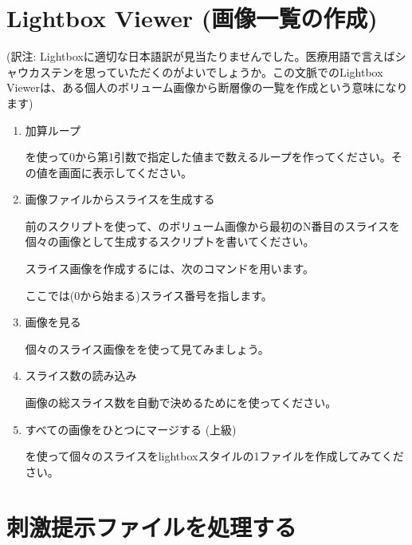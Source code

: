 \documentclass{jsarticle}
\begin{document}
\section{Lightbox Viewer (画像一覧の作成)}

\noindent (訳注: Lightboxに適切な日本語訳が見当たりませんでした。医療用語で言えばシャウカステンを思っていただくのがよいでしょうか。この文脈でのLightbox Viewerは、ある個人のボリューム画像から断層像の一覧を作成という意味になります)

\begin{enumerate}

\item 加算ループ

{\color{red}}を使って0から第1引数で指定した値まで数えるループを作ってください。その値を画面に表示してください。

\item 画像ファイルからスライスを生成する

前のスクリプトを使って、{\color{red}}のボリューム画像から最初のN番目のスライスを個々の画像として生成するスクリプトを書いてください。

スライス画像を作成するには、次のコマンドを用います。

{\color{red}}

ここで{\color{red}}は(0から始まる)スライス番号を指します。

\item 画像を見る

個々のスライス画像を{\color{red}}を使って見てみましょう。

\item スライス数の読み込み

画像の総スライス数を自動で決めるために{\color{red}}を使ってください。

\item すべての画像をひとつにマージする (上級)

{\color{red}}を使って個々のスライスをlightboxスタイルの1ファイルを作成してみてください。

\end{enumerate}

\section{刺激提示ファイルを処理する}
\end{document}
